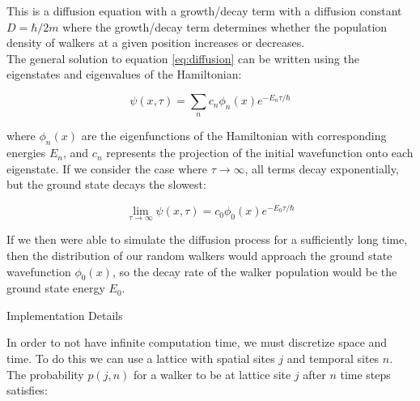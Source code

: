\documentclass[reqno]{amsart}
\makeatletter
\renewcommand\subsection{\@startsection{subsection}{2}%
  \z@{.5\linespacing\@plus.7\linespacing}{-.5em}%
  {\normalfont\scshape\justify}}
\numberwithin{equation}{section}
\numberwithin{figure}{section}
\makeatother
\begin{document}
This is a diffusion equation with a growth/decay term with a diffusion constant $D = \hbar/2m$ where the growth/decay term determines whether the population density of walkers at a given position increases or decreases. \\

The general solution to equation \ref{eq:diffusion} can be written using the eigenstates and eigenvalues of the Hamiltonian:

\begin{equation}
\psi(x,\tau) = \sum_n c_n \phi_n(x)e^{-E_n\tau/\hbar}
\end{equation}

where $\phi_n(x)$ are the eigenfunctions of the Hamiltonian with corresponding energies $E_n$, and $c_n$ represents the projection of the initial wavefunction onto each eigenstate. If we consider the case where $\tau \to \infty$, all terms decay exponentially, but the ground state decays the slowest:

\begin{equation}
\lim_{\tau \to \infty}\psi(x,\tau) = c_0\phi_0(x)e^{-E_0\tau/\hbar}
\end{equation}

If we then were able to simulate the diffusion process for a sufficiently long time, then the distribution of our random walkers would approach the ground state wavefunction $\phi_0(x)$, so the decay rate of the walker population would be the ground state energy $E_0$.

\subsection{Implementation Details}

In order to not have infinite computation time, we must discretize space and time. To do this we can use a lattice with spatial sites $j$ and temporal sites $n$. The probability $p(j,n)$ for a walker to be at lattice site $j$ after $n$ time steps satisfies:
\end{document}
